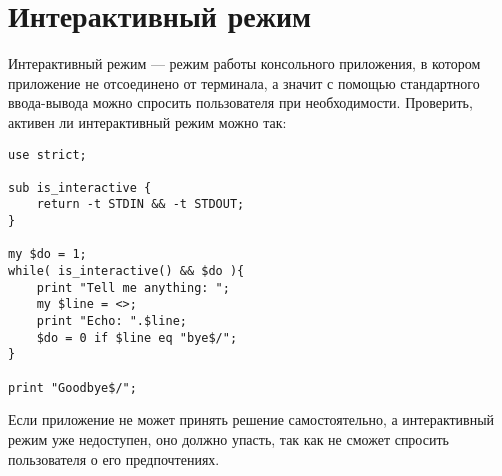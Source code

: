 \section{Интерактивный режим}
Интерактивный режим --- режим работы консольного приложения, в котором приложение не отсоединено от терминала, а значит с помощью стандартного ввода-вывода можно спросить пользователя при необходимости. Проверить, активен ли интерактивный режим можно так:
\begin{verbatim}
use strict;

sub is_interactive {
    return -t STDIN && -t STDOUT;
}

my $do = 1;
while( is_interactive() && $do ){
    print "Tell me anything: ";
    my $line = <>;
    print "Echo: ".$line;
    $do = 0 if $line eq "bye$/";
}

print "Goodbye$/";
\end{verbatim}
Если приложение не может принять решение самостоятельно, а интерактивный режим уже недоступен, оно должно упасть, так как не сможет спросить пользователя о его предпочтениях.
